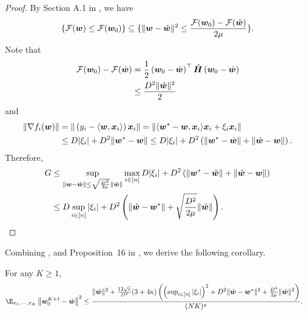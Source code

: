     \begin{proof}
        By Section A.1 in \citep{ahn2020sgd}, we have 
        \begin{align*}
            \{\mathcal{F}({\bm{w}})\leq\mathcal{F}({\bm{w}}_0)\}\subseteq \{\|{\bm{w}}-\hat{{\bm{w}}}\|^2\leq \frac{\mathcal{F}({\bm{w}}_0)-\mathcal{F}(\hat{{\bm{w}}})}{2\mu}\}.
        \end{align*}
        Note that 
        \begin{align*}
            \mathcal{F}({\bm{w}}_0)-\mathcal{F}(\hat{{\bm{w}}}) &=\frac{1}{2}\left({\bm{w}}_0-\hat{{\bm{w}}}\right)^{\top}\hat{{\bm{H}}}\left({\bm{w}}_0-\hat{{\bm{w}}}\right) \\
            &\leq \frac{D^2\|\hat{{\bm{w}}}\|^2}{2}
        \end{align*}
        and
        \begin{align*}
            \|\nabla f_i({\bm{w}})\|&=\|\left(y_i-\langle{\bm{w}}, {\bm{x}}_i\rangle\right) {\bm{x}}_i\|=\|\langle{\bm{w}}^*-{\bm{w}}, {\bm{x}}_i\rangle{\bm{x}}_i+\xi_i{\bm{x}}_i\| \\
            &\leq D|\xi_i|+D^2\|{\bm{w}}^*-{\bm{w}}\|\leq D|\xi_i|+D^2\left(\|{\bm{w}}^*-\hat{{\bm{w}}}\|+\|\hat{{\bm{w}}}-{\bm{w}}\|\right).
        \end{align*}
        Therefore,
        \begin{align*}
            G&\leq\sup_{\|{\bm{w}}-\hat{{\bm{w}}}\|\leq\sqrt{\frac{D^2}{2\mu}}\|\hat{{\bm{w}}}\|}\max_{i\in[n]}D|\xi_i|+D^2\left(\|{\bm{w}}^*-\hat{{\bm{w}}}\|+\|\hat{{\bm{w}}}-{\bm{w}}\|\right) \\
            &\leq D\sup_{i\in[n]}|\xi_i|+D^2\left(\|\hat{{\bm{w}}}-{\bm{w}}^*\|+\sqrt{\frac{D^2}{2\mu}}\|\hat{{\bm{w}}}\|\right).
        \end{align*}
    \end{proof}
Combining ,  and Proposition~16 in \citep{ahn2020sgd}, we derive the following corollary.
    \begin{corollary}
    \label{cor:schedule-111-a<1}
    
    For any $K\ge 1$,
    \begin{align}
    \E_{\pi_1, \cdots, \pi_{K}}\left\|\vw_0^{K+1}-\hat{\vw}\right\|^2
    &\le \frac{\|\hat{\vw}\|^2+\frac{12\sqrt{e}}{D^2}(3+4\kappa)\left(\left(\sup_{i\in[n]}|\xi_i|\right)^2+D^2\|\hat{\vw}-\vw^*\|^2+\frac{D^4}{2\mu}\|\hat{\vw}\|^2\right)}{(NK)^{a}}. \label{ineq:ERM-error-bound}
    \end{align}
    \end{corollary}
    
